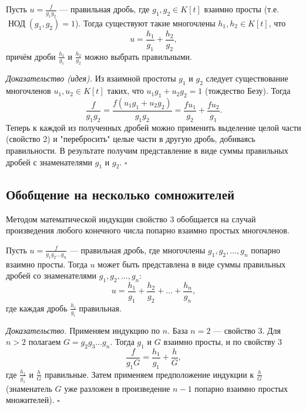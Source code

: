 \documentclass[a4paper,12pt]{article}
\theoremstyle{definition}
\theoremstyle{plain}
\theoremstyle{remark}
\begin{document}
	\begin{tcolorbox}[colback=blue!5, colframe=blue!40!black, title=Свойство 3 (Разложение по взаимно простым знаменателям)]
		Пусть \( u = \frac{f}{g_1 g_2} \) — правильная дробь, где \( g_1, g_2 \in K[t] \) взаимно просты (т.е. \( \operatorname{НОД}(g_1, g_2) = 1 \)). Тогда существуют такие многочлены \( h_1, h_2 \in K[t] \), что
		\[
		u = \frac{h_1}{g_1} + \frac{h_2}{g_2},
		\]
		причём дроби \( \frac{h_1}{g_1} \) и \( \frac{h_2}{g_2} \) можно выбрать правильными.
	\end{tcolorbox}
	
	\medskip
	\textit{Доказательство (идея).}
	Из взаимной простоты \( g_1 \) и \( g_2 \) следует существование многочленов \( u_1, u_2 \in K[t] \) таких, что \( u_1 g_1 + u_2 g_2 = 1 \) (тождество Безу). Тогда
	\[
	\frac{f}{g_1 g_2} = \frac{f(u_1 g_1 + u_2 g_2)}{g_1 g_2} = \frac{f u_1}{g_2} + \frac{f u_2}{g_1}.
	\]
	Теперь к каждой из полученных дробей можно применить выделение целой части (свойство 2) и "перебросить" целые части в другую дробь, добиваясь правильности. В результате получим представление в виде суммы правильных дробей с знаменателями \( g_1 \) и \( g_2 \). \hfill \(\square\)
	
	\subsection{Обобщение на несколько сомножителей}
	
	Методом математической индукции свойство 3 обобщается на случай произведения любого конечного числа попарно взаимно простых многочленов.
	
	\begin{tcolorbox}[colback=blue!5, colframe=blue!40!black, title=Свойство 4]
		Пусть \( u = \frac{f}{g_1 g_2 \dots g_n} \) — правильная дробь, где многочлены \( g_1, g_2, \dots, g_n \) попарно взаимно просты. Тогда \( u \) может быть представлена в виде суммы правильных дробей со знаменателями \( g_1, g_2, \dots, g_n \):
		\[
		u = \frac{h_1}{g_1} + \frac{h_2}{g_2} + \dots + \frac{h_n}{g_n},
		\]
		где каждая дробь \( \frac{h_i}{g_i} \) правильная.
	\end{tcolorbox}
	
	\medskip
	\textit{Доказательство.}
	Применяем индукцию по \( n \). База \( n = 2 \) — свойство 3. Для \( n > 2 \) полагаем \( G = g_2 g_3 \dots g_n \). Тогда \( g_1 \) и \( G \) взаимно просты, и по свойству 3
	\[
	\frac{f}{g_1 G} = \frac{h_1}{g_1} + \frac{h}{G},
	\]
	где \( \frac{h_1}{g_1} \) и \( \frac{h}{G} \) правильные. Затем применяем предположение индукции к \( \frac{h}{G} \) (знаменатель \( G \) уже разложен в произведение \( n-1 \) попарно взаимно простых множителей). \hfill \(\square\)
	
\end{document}
